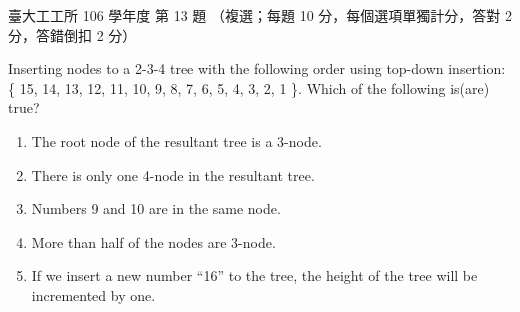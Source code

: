 \begin{pastexam}[label={px:ntu-106-ie-ds-13}]{臺大工工所 106 學年度 第 13 題}
（複選；每題 10 分，每個選項單獨計分，答對 2 分，答錯倒扣 2 分）

Inserting nodes to a 2-3-4 tree with the following order using top-down insertion:
\{ 15, 14, 13, 12, 11, 10, 9, 8, 7, 6, 5, 4, 3, 2, 1 \}. Which of the following is(are) true?
\begin{enumerate}[label=(\Alph*),nosep]
\item The root node of the resultant tree is a 3-node.
\item There is only one 4-node in the resultant tree.
\item Numbers 9 and 10 are in the same node.
\item More than half of the nodes are 3-node.
\item If we insert a new number ``16'' to the tree, the height of the tree will be incremented by one.
\end{enumerate}
\end{pastexam}

